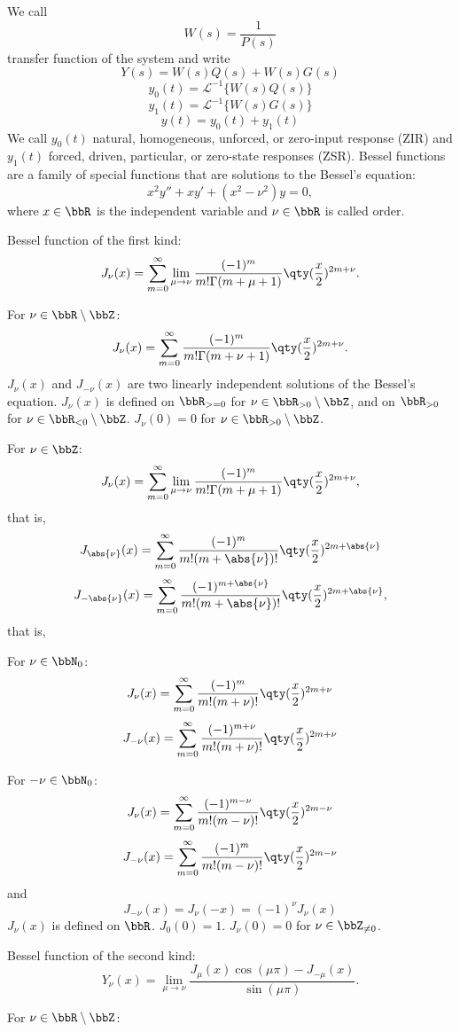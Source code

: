 \documentclass[a4paper,12pt]{report}
\begin{document}
We call
\[W(s)=\frac{1}{P(s)}\]
transfer function of the system and write
\[Y(s)=W(s)Q(s)+W(s)G(s)\]
\[y_0(t)=\mathcal{L}^{-1}\{W(s)Q(s)\}\]
\[y_1(t)=\mathcal{L}^{-1}\{W(s)G(s)\}\]
\[y(t)=y_0(t)+y_1(t)\]
We call $y_0(t)$ natural, homogeneous, unforced, or zero-input response (ZIR) and $y_1(t)$ forced, driven, particular, or zero-state responses (ZSR).
Bessel functions are a family of special functions that are solutions to the Bessel's equation:
\[x^2y''+xy'+(x^2-\nu^2)y=0,\]
where $x\in\bbR$ is the independent variable and $\nu\in\bbR$ is called order.
\bit
\item Bessel function of the first kind:
    \[J_{\nu}(x)=\sum_{m=0}^{\infty}\lim_{\mu\to\nu}\frac{(-1)^m}{m!\Gamma(m+\mu+1)}\qty(\frac{x}{2})^{2m+\nu}.\]
\bit
\item For $\nu\in\bbR\setminus\bbZ$:
    \[J_{\nu}(x)=\sum_{m=0}^{\infty}\frac{(-1)^m}{m!\Gamma(m+\nu+1)}\qty(\frac{x}{2})^{2m+\nu}.\]
    $J_{\nu}(x)$ and $J_{-\nu}(x)$ are two linearly independent solutions of the Bessel's equation. $J_{\nu}(x)$ is defined on $\bbR_{>=0}$ for $\nu\in\bbR_{>0}\setminus\bbZ$, and on $\bbR_{>0}$ for $\nu\in\bbR_{<0}\setminus\bbZ$. $J_{\nu}(0)=0$ for $\nu\in\bbR_{>0}\setminus\bbZ$.
\item For $\nu\in\bbZ$:
    \[J_{\nu}(x)=\sum_{m=0}^{\infty}\lim_{\mu\to\nu}\frac{(-1)^m}{m!\Gamma(m+\mu+1)}\qty(\frac{x}{2})^{2m+\nu},\]
    that is,
    \[J_{\abs{\nu}}(x)=\sum_{m=0}^{\infty}\frac{(-1)^m}{m!(m+\abs{\nu})!}\qty(\frac{x}{2})^{2m+\abs{\nu}}\]
    \[J_{-\abs{\nu}}(x)=\sum_{m=0}^{\infty}\frac{(-1)^{m+\abs{\nu}}}{m!(m+\abs{\nu})!}\qty(\frac{x}{2})^{2m+\abs{\nu}},\]
    that is,
\bit
\item For $\nu\in\bbN_0$:
\[J_{\nu}(x)=\sum_{m=0}^{\infty}\frac{(-1)^m}{m!(m+\nu)!}\qty(\frac{x}{2})^{2m+\nu}\]
\[J_{-\nu}(x)=\sum_{m=0}^{\infty}\frac{(-1)^{m+\nu}}{m!(m+\nu)!}\qty(\frac{x}{2})^{2m+\nu}\]
\item For $-\nu\in\bbN_0$:
\[J_{\nu}(x)=\sum_{m=0}^{\infty}\frac{(-1)^{m-\nu}}{m!(m-\nu)!}\qty(\frac{x}{2})^{2m-\nu}\]
\[J_{-\nu}(x)=\sum_{m=0}^{\infty}\frac{(-1)^m}{m!(m-\nu)!}\qty(\frac{x}{2})^{2m-\nu}\]
\eit
and
\[J_{-\nu}(x)=J_{\nu}(-x)=(-1)^{\nu}J_{\nu}(x)\]
$J_{\nu}(x)$ is defined on $\bbR$. $J_0(0)=1$. $J_{\nu}(0)=0$ for $\nu\in\bbZ_{\ne0}$.
\eit
\item Bessel function of the second kind:
    \[Y_{\nu}(x)=\lim_{\mu\to\nu}\frac{J_{\mu}(x)\cos(\mu\pi)-J_{-\mu}(x)}{\sin(\mu\pi)}.\]
\bit
\item For $\nu\in\bbR\setminus\bbZ$:
\end{document}

